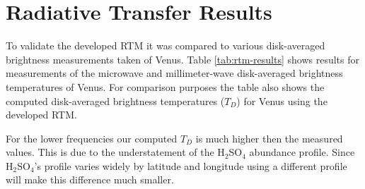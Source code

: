 \section{Radiative Transfer Results}
To validate the developed RTM it was compared to various disk-averaged brightness measurements taken of Venus. Table \ref{tab:rtm-results} shows results for measurements of the microwave and millimeter-wave disk-averaged brightness temperatures of Venus. For comparison purposes the table also shows the computed disk-averaged brightness temperatures ($T_D$) for Venus using the developed RTM. 

For the lower frequencies our computed $T_D$ is much higher then the measured values. This is due to the understatement of the H$_2$SO$_4$ abundance profile. Since H$_2$SO$_4$'s profile varies widely by latitude and longitude using a different profile will make this difference much smaller. 

